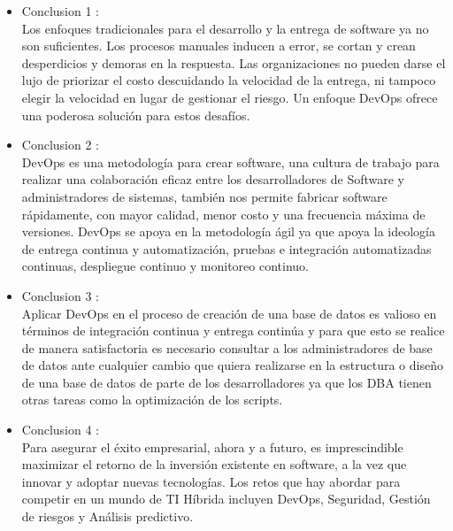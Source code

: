\documentclass[preprint,12pt]{elsarticle}
\begin{document}
\begin{itemize}

\item Conclusion 1 : \\ Los enfoques tradicionales para el desarrollo y la entrega de software ya no son suficientes. Los procesos manuales inducen a error,
se cortan y crean desperdicios y demoras en la respuesta. Las organizaciones no pueden darse el lujo de priorizar el costo descuidando la velocidad de la entrega, ni tampoco elegir la velocidad en lugar de gestionar el riesgo. Un enfoque DevOps ofrece una poderosa solución para estos desafíos. 

\item Conclusion 2 : \\ DevOps es una metodología para crear software, una cultura de trabajo para realizar una colaboración eficaz entre los desarrolladores de Software y administradores de sistemas, también nos permite fabricar software rápidamente, con mayor calidad, menor costo y una frecuencia máxima de versiones. DevOps se apoya en la metodología ágil ya que apoya la ideología de entrega continua y automatización, pruebas e integración automatizadas continuas, despliegue continuo y monitoreo continuo.

\item Conclusion 3 : \\ Aplicar DevOps en el proceso de creación de una base de datos es valioso en términos de integración continua y entrega continúa y para que esto se realice de manera satisfactoria es necesario consultar a los administradores de base de datos ante cualquier cambio que quiera realizarse en la estructura o diseño de una base de datos de parte de los desarrolladores ya que los DBA tienen otras tareas como la optimización de los scripts.

\item Conclusion 4 : \\ Para asegurar el éxito empresarial, ahora y a futuro, es imprescindible maximizar el retorno de la inversión existente en software, a la vez que innovar y adoptar nuevas tecnologías. Los retos que hay abordar para competir en un mundo de TI Híbrida incluyen DevOps, Seguridad, Gestión de riesgos y Análisis predictivo.
\end{itemize}


	
	\newpage
	
		 
	
	
\end{document}
